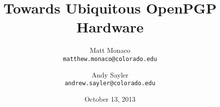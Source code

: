 \documentclass[letterpaper,twocolumn,10pt]{article}
\begin{document}
%
%

	\title{\Large \bf
		Towards Ubiquitous OpenPGP Hardware
	}

	\date{October 13, 2013}

	\author{
		Matt Monaco \\
		\texttt{matthew.monaco@colorado.edu}
		\and
		Andy Sayler \\
		\texttt{andrew.sayler@colorado.edu}
	}

	\maketitle

\begin{abstract}
\end{abstract}

%
%


%
%

	\nocite{*}
	\footnotesize
	
	
\end{document}
